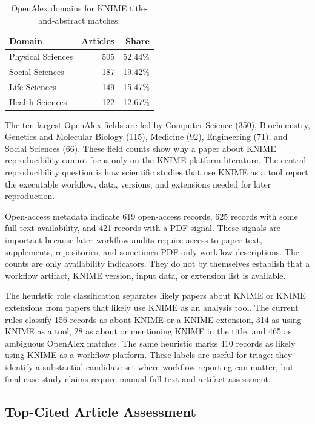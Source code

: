 \documentclass[runningheads]{llncs}
\begin{document}
\begin{table}
\centering
\caption{OpenAlex domains for KNIME title-and-abstract matches.}
\label{tab:openalex-domains}
\begin{tabular}{lrr}
\toprule
Domain & Articles & Share \\
\midrule
Physical Sciences & 505 & 52.44\% \\
Social Sciences & 187 & 19.42\% \\
Life Sciences & 149 & 15.47\% \\
Health Sciences & 122 & 12.67\% \\
\bottomrule
\end{tabular}
\end{table}

The ten largest OpenAlex fields are led by Computer Science (350),
Biochemistry, Genetics and Molecular Biology (115), Medicine (92),
Engineering (71), and Social Sciences (66). These field counts show why a
paper about KNIME reproducibility cannot focus only on the KNIME platform
literature. The central reproducibility question is how scientific studies
that use KNIME as a tool report the executable workflow, data, versions, and
extensions needed for later reproduction.

Open-access metadata indicate 619 open-access records, 625 records with some
full-text availability, and 421 records with a PDF signal. These signals are
important because later workflow audits require access to paper text,
supplements, repositories, and sometimes PDF-only workflow descriptions. The
counts are only availability indicators. They do not by themselves establish
that a workflow artifact, KNIME version, input data, or extension list is
available.

The heuristic role classification separates likely papers about KNIME or KNIME
extensions from papers that likely use KNIME as an analysis tool. The current
rules classify 156 records as about KNIME or a KNIME extension, 314 as using
KNIME as a tool, 28 as about or mentioning KNIME in the title, and 465 as
ambiguous OpenAlex matches. The same heuristic marks 410 records as likely
using KNIME as a workflow platform. These labels are useful for triage: they
identify a substantial candidate set where workflow reporting can matter, but
final case-study claims require manual full-text and artifact assessment.

\subsection{Top-Cited Article Assessment}
\end{document}
